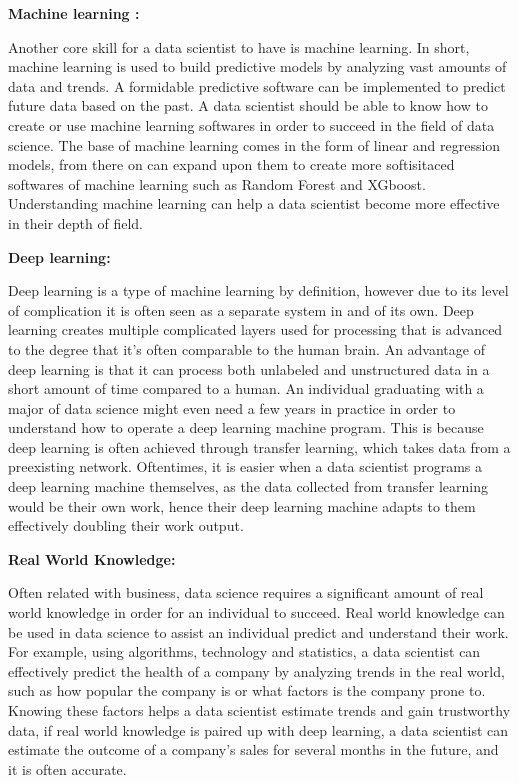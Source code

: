 \documentclass[a4paper, 11pt]{report}
\begin{document}
\bigskip

\textbf{Machine learning :}
\par Another core skill for a data scientist to have is machine learning. In short, machine learning is used to build predictive models by analyzing vast amounts of data and trends. A formidable predictive software can be implemented to predict future data based on the past. A data scientist should be able to know how to create or use machine learning softwares in order to succeed in the field of data science. The base of machine learning comes in the form of linear and regression models, from there on can expand upon them to create more softisitaced softwares of machine learning such as Random Forest and XGboost. Understanding machine learning can help a data scientist become more effective in their depth of field.

\bigskip

\textbf{Deep learning:}
\par Deep learning is a type of machine learning by definition, however due to its level of complication it is often seen as a separate system in and of its own. Deep learning creates multiple complicated layers used for processing that is advanced to the degree that it's often comparable to the human brain. An advantage of deep learning is that it can process both unlabeled and unstructured data in a short amount of time compared to a human. An individual graduating with a major of data science might even need a few years in practice in order to understand how to operate a deep learning machine program. This is because deep learning is often achieved through transfer learning, which takes data from a preexisting network. Oftentimes, it is easier when a data scientist programs a deep learning machine themselves, as the data collected from transfer learning would be their own work, hence their deep learning machine adapts to them effectively doubling their work output.
\bigskip

\textbf{Real World Knowledge:}
\par Often related with business, data science requires a significant amount of real world knowledge in order for an individual to succeed. Real world knowledge can be used in data science to assist an individual predict and understand their work. For example, using algorithms, technology and statistics, a data scientist can effectively predict the health of a company by analyzing trends in the real world, such as how popular the company is or what factors is the company prone to. Knowing these factors helps a data scientist estimate trends and gain trustworthy data, if real world knowledge is paired up with deep learning, a data scientist can estimate the outcome of a company's sales for several months in the future, and it is often accurate.
\end{document}
